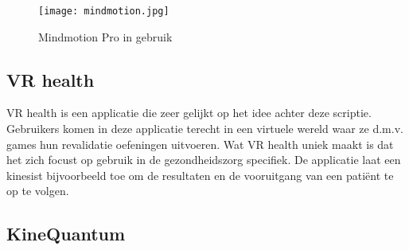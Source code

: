 \begin{figure}[h]
    \centering
    \texttt{[image: mindmotion.jpg]}
    \caption{Mindmotion Pro in gebruik}
\end{figure}

\subsection{VR health}
VR health is een applicatie die zeer gelijkt op het idee achter deze scriptie. Gebruikers komen in deze applicatie terecht in een virtuele wereld waar ze d.m.v. games hun revalidatie oefeningen uitvoeren. Wat VR health uniek maakt is dat het zich focust op gebruik in de gezondheidszorg specifiek. De applicatie laat een kinesist bijvoorbeeld toe om de resultaten en de vooruitgang van een patiënt te op te volgen. 

\subsection{KineQuantum}

